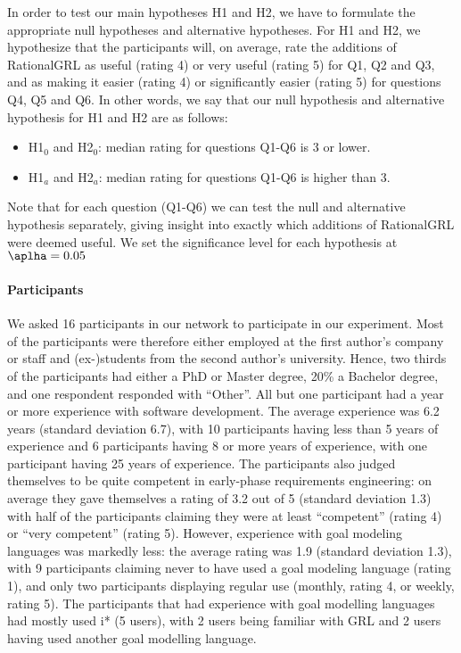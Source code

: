 In order to test our main hypotheses H1 and H2, we have to formulate the appropriate null hypotheses and alternative hypotheses. For H1 and H2, we hypothesize that the participants will, on average, rate the additions of RationalGRL as useful (rating 4) or very useful (rating 5) for Q1, Q2 and Q3, and as making it easier (rating 4) or significantly easier (rating 5) for questions Q4, Q5 and Q6. In other words, we say that our null hypothesis and alternative hypothesis for H1 and H2 are as follows:
\begin{itemize}
\item H1$_{0}$ and H2$_{0}$: median rating for questions Q1-Q6 is 3 or lower.
\item H1$_{a}$ and H2$_{a}$: median rating for questions Q1-Q6 is higher than 3.
\end{itemize}
Note that for each question (Q1-Q6) we can test the null and alternative hypothesis separately, giving insight into exactly which additions of RationalGRL were deemed useful. We set the significance level for each hypothesis at $\aplha = 0.05$

\paragraph{Participants}
We asked 16 participants in our network to participate in our experiment. Most of the participants were therefore either employed at the first author's company or staff and (ex-)students from the second author's university. Hence, two thirds of the participants had either a PhD or Master degree, 20\% a Bachelor degree, and one respondent responded with ``Other''. All but one participant had a year or more experience with software development. The average experience was 6.2 years (standard deviation 6.7), with 10 participants having less than 5 years of experience and 6 participants having 8 or more years of experience, with one participant having 25 years of experience. The participants also judged themselves to be quite competent in  early-phase requirements engineering: on average they gave themselves a rating of 3.2 out of 5 (standard deviation 1.3) with half of the participants claiming they were at least ``competent'' (rating 4) or ``very competent'' (rating 5). However, experience with goal modeling languages was markedly less: the average rating was 1.9 (standard deviation 1.3), with 9 participants claiming never to have used a goal modeling language (rating 1), and only two participants displaying regular use (monthly, rating 4, or weekly, rating 5). The participants that had experience with goal modelling languages had mostly used i* (5 users), with 2 users being familiar with GRL and 2 users having used another goal modelling language.

